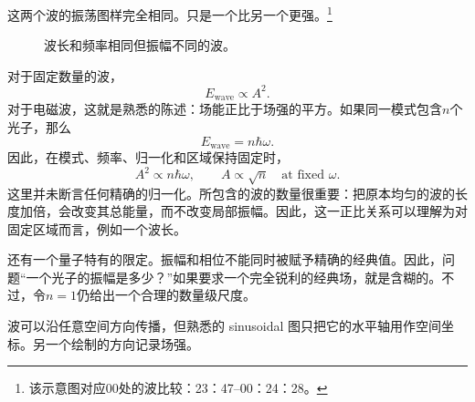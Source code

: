 这两个波的振荡图样完全相同。只是一个比另一个更强。\footnote{该示意图对应00处的波比较：23：47--00：24：28。}

\begin{figure}[t]
\centering
{}
\caption{波长和频率相同但振幅不同的波。}
\end{figure}

对于固定数量的波，
\begin{equation}
E_{\text{wave}}\propto A^2.
\end{equation}
对于电磁波，这就是熟悉的陈述：场能正比于场强的平方。如果同一模式包含\(n\)个光子，那么
\begin{equation}
E_{\text{wave}}=n\hbar\omega.
\end{equation}
因此，在模式、频率、归一化和区域保持固定时，
\begin{equation}
A^2\propto n\hbar\omega,
\qquad
A\propto\sqrt n\quad\text{at fixed }\omega.
\end{equation}
这里并未断言任何精确的归一化。所包含的波的数量很重要：把原本均匀的波的长度加倍，会改变其总能量，而不改变局部振幅。因此，这一正比关系可以理解为对固定区域而言，例如一个波长。

还有一个量子特有的限定。振幅和相位不能同时被赋予精确的经典值。因此，问题``一个光子的振幅是多少？''如果要求一个完全锐利的经典场，就是含糊的。不过，令\(n=1\)仍给出一个合理的数量级尺度。

\begin{classroomqa}
\end{classroomqa}

波可以沿任意空间方向传播，但熟悉的 sinusoidal 图只把它的水平轴用作空间坐标。另一个绘制的方向记录场强。

\begin{classroomqa}
\end{classroomqa}

